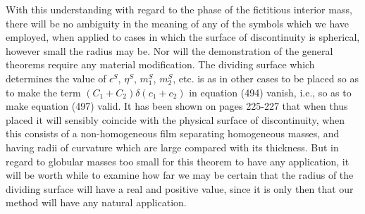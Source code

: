 \documentclass[12pt]{article}
\newcommand{\dd}{\delta}
\begin{document}
{With this understanding with regard to the phase of the fictitious interior mass, there will be no ambiguity in the meaning of any of the symbols which we have employed, when applied to cases in which the surface of discontinuity is spherical, however small the radius may be. Nor will the demonstration of the general theorems require any material modification. The dividing surface which determines the value of $\epsilon^S$, $\eta^S$, $m_1^S$, $m_2^S$, etc. is as in other cases to be placed so as to make the term $(C_1 + C_2) \dd (c_1 + c_2)$ in equation (494) vanish, i.e., so as to make equation (497) valid. It has been shown on pages 225-227 that when thus placed it will sensibly coincide with the physical surface of discontinuity, when this consists of a non-homogeneous film separating homogeneous masses, and having radii of curvature which are large compared with its thickness. But in regard to globular masses too small for this theorem to have any application, it will be worth while to examine how far we may be certain that the radius of the dividing surface will have a real and positive value, since it is only then that our method will have any natural application. 

}
\end{document}
